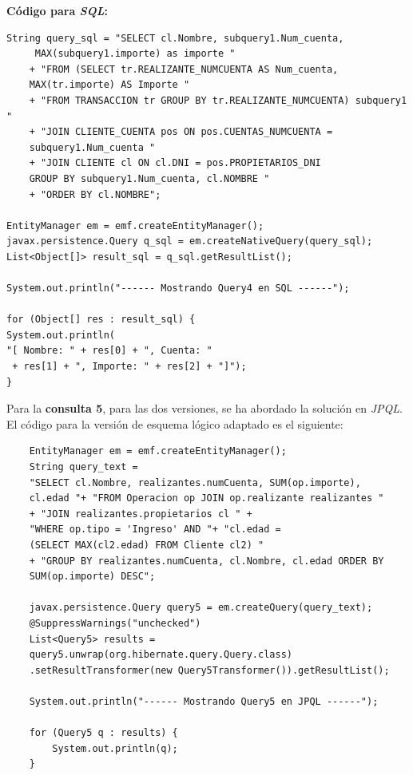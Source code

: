 \documentclass[11pt,a4paper]{article}
\begin{document}
\bigbreak
\textbf{Código para \textit{SQL}:}

\begin{lstlisting}
String query_sql = "SELECT cl.Nombre, subquery1.Num_cuenta,
	 MAX(subquery1.importe) as importe "
	+ "FROM (SELECT tr.REALIZANTE_NUMCUENTA AS Num_cuenta, 
	MAX(tr.importe) AS Importe "
	+ "FROM TRANSACCION tr GROUP BY tr.REALIZANTE_NUMCUENTA) subquery1 "
	+ "JOIN CLIENTE_CUENTA pos ON pos.CUENTAS_NUMCUENTA = 
	subquery1.Num_cuenta "
	+ "JOIN CLIENTE cl ON cl.DNI = pos.PROPIETARIOS_DNI 
	GROUP BY subquery1.Num_cuenta, cl.NOMBRE "
	+ "ORDER BY cl.NOMBRE";

EntityManager em = emf.createEntityManager();
javax.persistence.Query q_sql = em.createNativeQuery(query_sql);
List<Object[]> result_sql = q_sql.getResultList();

System.out.println("------ Mostrando Query4 en SQL ------");

for (Object[] res : result_sql) {
System.out.println(
"[ Nombre: " + res[0] + ", Cuenta: "
 + res[1] + ", Importe: " + res[2] + "]");
}

\end{lstlisting}


\newpage
Para la \textbf{consulta 5}, para las dos versiones, se ha abordado la solución en \emph{JPQL}. \\
El código para la versión de esquema lógico adaptado es el siguiente:

\begin{lstlisting}
	EntityManager em = emf.createEntityManager();
   	String query_text = 
    "SELECT cl.Nombre, realizantes.numCuenta, SUM(op.importe), 
    cl.edad "+ "FROM Operacion op JOIN op.realizante realizantes "
    + "JOIN realizantes.propietarios cl " + 
    "WHERE op.tipo = 'Ingreso' AND "+ "cl.edad = 
    (SELECT MAX(cl2.edad) FROM Cliente cl2) "
    + "GROUP BY realizantes.numCuenta, cl.Nombre, cl.edad ORDER BY 
    SUM(op.importe) DESC";

    javax.persistence.Query query5 = em.createQuery(query_text);
   	@SuppressWarnings("unchecked")
    List<Query5> results = 
    query5.unwrap(org.hibernate.query.Query.class)
    .setResultTransformer(new Query5Transformer()).getResultList();

   	System.out.println("------ Mostrando Query5 en JPQL ------");

  	for (Query5 q : results) {
   		System.out.println(q);
  	}
\end{lstlisting}
\end{document}
